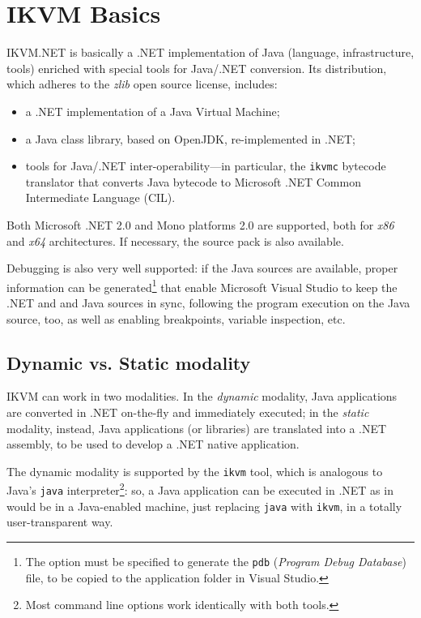 \section{IKVM Basics}
\label{sec:dotnet-ikvm}

IKVM.NET \cite{ikvm} is basically a .NET implementation of Java (language, infrastructure, tools) enriched with special tools for Java/.NET conversion.
Its distribution, which adheres to the \textit{zlib} open source license, includes:
\begin{itemize}
  \item a .NET implementation of a Java Virtual Machine;
  \item a Java class library, based on OpenJDK, re-implemented in .NET;
  \item tools for Java/.NET inter-operability---in particular, the \texttt{ikvmc} bytecode translator that converts Java bytecode to Microsoft .NET Common Intermediate Language (CIL).
\end{itemize}

\noindent Both Microsoft .NET 2.0 and Mono platforms 2.0 are supported, both for \textit{x86} and \textit{x64} architectures. If necessary, the source pack is also available.

Debugging is also very well supported: if the Java sources are available, proper information can be generated\footnote{The option must be specified to generate the \texttt{pdb} (\textit{Program Debug Database}) file, to be copied to the application folder in Visual Studio.} that enable Microsoft Visual Studio to keep the .NET and and Java sources in sync, following the program execution on the Java source, too, as well as enabling breakpoints, variable inspection, etc.

\subsection{Dynamic vs. Static modality}
\label{ssec:ikvm-dynamic-static}

IKVM can work in two modalities. In the \textit{dynamic} modality, Java applications are converted in .NET on-the-fly and immediately executed; in the \textit{static} modality, instead, Java applications (or libraries) are translated into a .NET assembly, to be used to develop a .NET native application.

The dynamic modality is supported by the \texttt{ikvm} tool, which is analogous to Java's \texttt{java} interpreter\footnote{Most command line options work identically with both tools.}: so, a Java application can be executed in .NET as in would be in a Java-enabled machine, just replacing \texttt{java} with \texttt{ikvm}, in a totally user-transparent way.

